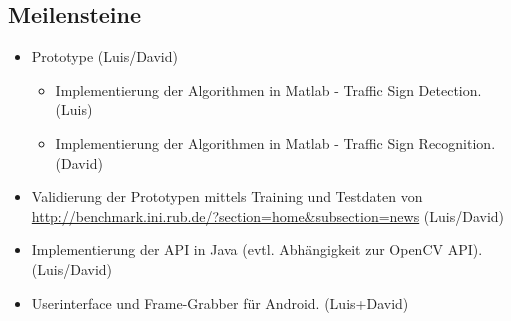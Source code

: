 \subsection*{Meilensteine}
	\begin{itemize}
        \item Prototype \hfill (Luis/David)
        \begin{itemize}
            \item Implementierung der Algorithmen in Matlab - Traffic Sign Detection. \hfill (Luis)
            \item Implementierung der Algorithmen in Matlab  - Traffic Sign Recognition. \hfill (David)
        \end{itemize}
        \item Validierung der Prototypen mittels Training und Testdaten von \url{http://benchmark.ini.rub.de/?section=home&subsection=news} \hfill (Luis/David)
	    \item Implementierung der API in Java (evtl. Abhängigkeit zur OpenCV API). \hfill (Luis/David)
        \item Userinterface und Frame-Grabber für Android. \hfill (Luis+David)
	\end{itemize}
